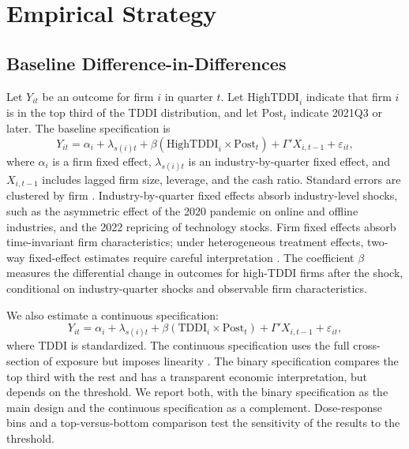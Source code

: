 \section{Empirical Strategy}
\label{sec:strategy}

\subsection{Baseline Difference-in-Differences}

Let $Y_{it}$ be an outcome for firm $i$ in quarter $t$. Let $\text{HighTDDI}_i$ indicate that firm $i$ is in the top third of the TDDI distribution, and let $\text{Post}_t$ indicate 2021Q3 or later. The baseline specification is
\begin{equation}
Y_{it}=\alpha_i+\lambda_{s(i)t}+\beta\left(\text{HighTDDI}_i\times\text{Post}_t\right)+\Gamma'X_{i,t-1}+\varepsilon_{it},
\label{eq:did}
\end{equation}
where $\alpha_i$ is a firm fixed effect, $\lambda_{s(i)t}$ is an industry-by-quarter fixed effect, and $X_{i,t-1}$ includes lagged firm size, leverage, and the cash ratio. Standard errors are clustered by firm \cite{cameron2015}. Industry-by-quarter fixed effects absorb industry-level shocks, such as the asymmetric effect of the 2020 pandemic on online and offline industries, and the 2022 repricing of technology stocks. Firm fixed effects absorb time-invariant firm characteristics; under heterogeneous treatment effects, two-way fixed-effect estimates require careful interpretation \cite{dechaisemartin2020}. The coefficient $\beta$ measures the differential change in outcomes for high-TDDI firms after the shock, conditional on industry-quarter shocks and observable firm characteristics.

We also estimate a continuous specification:
\begin{equation}
Y_{it}=\alpha_i+\lambda_{s(i)t}+\beta\left(\text{TDDI}_i\times\text{Post}_t\right)+\Gamma'X_{i,t-1}+\varepsilon_{it},
\label{eq:continuous}
\end{equation}
where TDDI is standardized. The continuous specification uses the full cross-section of exposure but imposes linearity \cite{callaway2024}. The binary specification compares the top third with the rest and has a transparent economic interpretation, but depends on the threshold. We report both, with the binary specification as the main design and the continuous specification as a complement. Dose-response bins and a top-versus-bottom comparison test the sensitivity of the results to the threshold.

